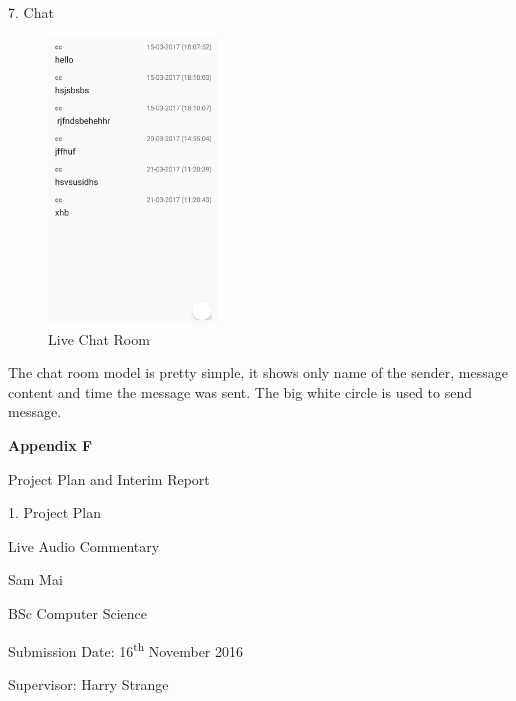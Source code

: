 \documentclass{article}
\begin{document}
\begin{flushleft}
{\large 7. Chat}\par
\begin{figure}[H]
	\centering
	\includegraphics[width=0.40\textwidth]{chat}
	\caption{Live Chat Room}
	\label{fig:chat}
\end{figure}
The chat room model is pretty simple, it shows only name of the sender, message content and time the message was sent. The big white circle is used to send message.\par
{\Large \textbf{Appendix F}}\par
{\huge Project Plan and Interim Report}\par
{\large 1. Project Plan}\par
\end{flushleft}
\newpage
\begin{center}
{\Huge Live Audio Commentary\\[5cm]}

{\Large Sam Mai

BSc Computer Science

Submission Date: 16\textsuperscript{th} November 2016

Supervisor: Harry Strange}
\end{center}
\newpage
\end{document}
